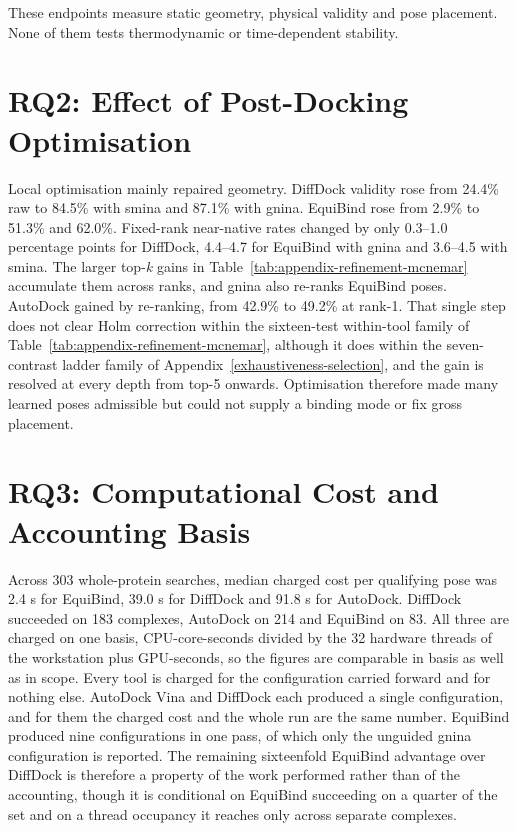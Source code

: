 These endpoints measure static geometry, physical validity and pose placement. None of them tests thermodynamic or time-dependent stability.

\hypertarget{rq2-effect-of-post-docking-optimisation}{%
\section{RQ2: Effect of Post-Docking Optimisation}\label{rq2-effect-of-post-docking-optimisation}}

Local optimisation mainly repaired geometry. DiffDock validity rose from 24.4\% raw to 84.5\% with smina and 87.1\% with gnina. EquiBind rose from 2.9\% to 51.3\% and 62.0\%. Fixed-rank near-native rates changed by only 0.3--1.0 percentage points for DiffDock, 4.4--4.7 for EquiBind with gnina and 3.6--4.5 with smina. The larger top-\emph{k} gains in Table~\ref{tab:appendix-refinement-mcnemar} accumulate them across ranks, and gnina also re-ranks EquiBind poses. AutoDock gained by re-ranking, from 42.9\% to 49.2\% at rank-1. That single step does not clear Holm correction within the sixteen-test within-tool family of Table~\ref{tab:appendix-refinement-mcnemar}, although it does within the seven-contrast ladder family of Appendix~\ref{exhaustiveness-selection}, and the gain is resolved at every depth from top-5 onwards. Optimisation therefore made many learned poses admissible but could not supply a binding mode or fix gross placement.

\hypertarget{rq3-computational-efficiency}{%
\section{RQ3: Computational Cost and Accounting Basis}\label{rq3-computational-efficiency}}

Across 303 whole-protein searches, median charged cost per qualifying pose was 2.4 s for EquiBind, 39.0 s for DiffDock and 91.8 s for AutoDock. DiffDock succeeded on 183 complexes, AutoDock on 214 and EquiBind on 83. All three are charged on one basis, CPU-core-seconds divided by the 32 hardware threads of the workstation plus GPU-seconds, so the figures are comparable in basis as well as in scope. Every tool is charged for the configuration carried forward and for nothing else. AutoDock Vina and DiffDock each produced a single configuration, and for them the charged cost and the whole run are the same number. EquiBind produced nine configurations in one pass, of which only the unguided gnina configuration is reported. The remaining sixteenfold EquiBind advantage over DiffDock is therefore a property of the work performed rather than of the accounting, though it is conditional on EquiBind succeeding on a quarter of the set and on a thread occupancy it reaches only across separate complexes.

